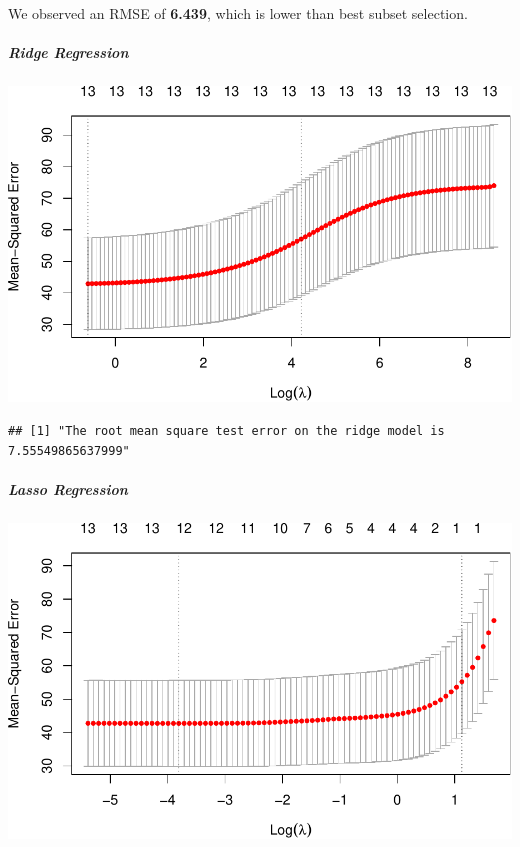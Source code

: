 \documentclass[
]{article}
\begin{document}
We observed an RMSE of \textbf{6.439}, which is lower than best subset
selection.

\hypertarget{ridge-regression}{%
\subparagraph{\texorpdfstring{\textbf{Ridge
Regression}}{Ridge Regression}}\label{ridge-regression}}

\begin{center}\includegraphics{Disha_Gandhi_Take_Home_Exam_PDF_files/figure-latex/unnamed-chunk-62-1} \end{center}

\begin{verbatim}
## [1] "The root mean square test error on the ridge model is 7.55549865637999"
\end{verbatim}

\hypertarget{lasso-regression}{%
\subparagraph{\texorpdfstring{\textbf{Lasso
Regression}}{Lasso Regression}}\label{lasso-regression}}

\begin{center}\includegraphics{Disha_Gandhi_Take_Home_Exam_PDF_files/figure-latex/unnamed-chunk-64-1} \end{center}
\end{document}
